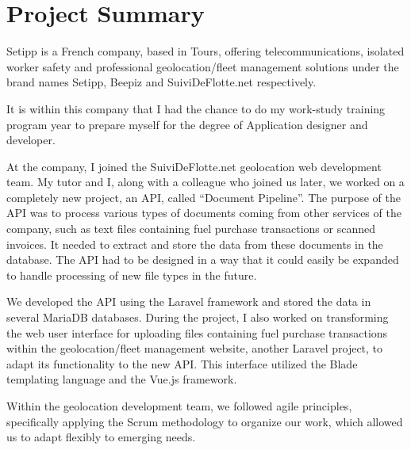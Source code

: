 \chapter{Project Summary}\label{ch:project-summary}


Setipp is a French company, based in Tours, offering telecommunications, isolated worker safety and professional geolocation/fleet management solutions under the brand names Setipp, Beepiz and SuiviDeFlotte.net respectively.

It is within this company that I had the chance to do my work-study training program year to prepare myself for the degree of Application designer and developer.

At the company, I joined the SuiviDeFlotte.net geolocation web development team. My tutor and I, along with a colleague who joined us later, we worked on a completely new project, an API, called ``Document Pipeline''. The purpose of the API was to process various types of documents coming from other services of the company, such as text files containing fuel purchase transactions or scanned invoices. It needed to extract and store the data from these documents in the database. The API had to be designed in a way that it could easily be expanded to handle processing of new file types in the future.

We developed the API using the Laravel framework and stored the data in several MariaDB databases. During the project, I also worked on transforming the web user interface for uploading files containing fuel purchase transactions within the geolocation/fleet management website, another Laravel project, to adapt its functionality to the new API. This interface utilized the Blade templating language and the Vue.js framework.

Within the geolocation development team, we followed agile principles, specifically applying the Scrum methodology to organize our work, which allowed us to adapt flexibly to emerging needs.